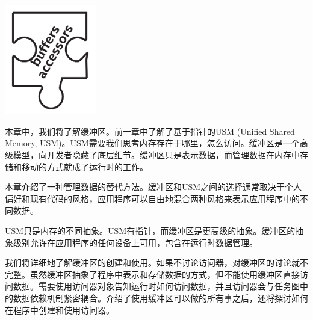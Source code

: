 \begin{center}
	\includegraphics[width=0.3\textwidth]{content/chapter-7/images/1}
\end{center}

本章中，我们将了解缓冲区。前一章中了解了基于指针的USM (Unified Shared Memory, USM)。USM需要我们思考内存存在于哪里，怎么访问。缓冲区是一个高级模型，向开发者隐藏了底层细节。缓冲区只是表示数据，而管理数据在内存中存储和移动的方式就成了运行时的工作。\par

本章介绍了一种管理数据的替代方法。缓冲区和USM之间的选择通常取决于个人偏好和现有代码的风格，应用程序可以自由地混合两种风格来表示应用程序中的不同数据。\par

USM只是内存的不同抽象。USM有指针，而缓冲区是更高级的抽象。缓冲区的抽象级别允许在应用程序的任何设备上可用，包含在运行时数据管理。\par

我们将详细地了解缓冲区的创建和使用。如果不讨论访问器，对缓冲区的讨论就不完整。虽然缓冲区抽象了程序中表示和存储数据的方式，但不能使用缓冲区直接访问数据。需要使用访问器对象告知运行时如何访问数据，并且访问器会与任务图中的数据依赖机制紧密耦合。介绍了使用缓冲区可以做的所有事之后，还将探讨如何在程序中创建和使用访问器。\par

























